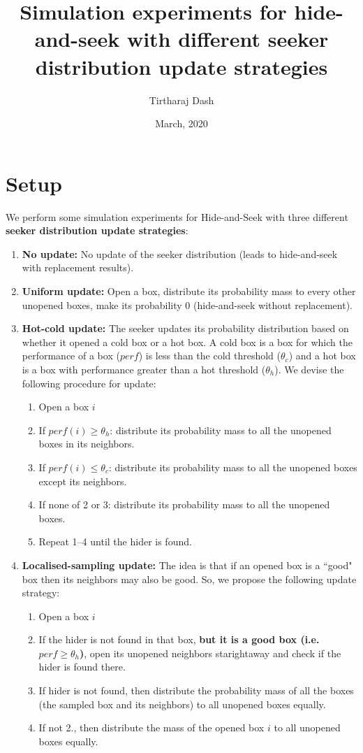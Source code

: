 \documentclass[11pt,a4paper]{article}
\title{Simulation experiments for hide-and-seek with different seeker distribution update strategies}
\author{Tirtharaj Dash}
\date{March, 2020}
\begin{document}
\maketitle

\section{Setup}

\noindent
We perform some simulation experiments for Hide-and-Seek with three different \textbf{seeker distribution update strategies}:
\begin{enumerate}[(1)]
	\item\label{snoupd} \textbf{No update:} No update of the seeker distribution (leads to hide-and-seek with replacement results).
	\item\label{supdwor} \textbf{Uniform update:} Open a box, distribute its probability mass to every other unopened boxes, make its probability 0 (hide-and-seek without replacement).
	\item\label{supdhc} \textbf{Hot-cold update:} The seeker updates its probability distribution based on whether it opened a cold box or a hot box. A cold box is a box for which the performance of a box ($perf$) is less than the cold threshold ($\theta_c$) and a hot box is a box with performance greater than a hot threshold ($\theta_h$). We devise the following procedure for update:
	\begin{enumerate}[1.]
		\item Open a box $i$
		\item If $perf(i) \geq \theta_h$: distribute its probability mass to all the unopened boxes in its neighbors. 
		\item If $perf(i) \leq \theta_c$: distribute its probability mass to all the unopened boxes except its neighbors.
		\item If none of 2 or 3: distribute its probability mass to all the unopened boxes.
		\item Repeat 1--4 until the hider is found.
	\end{enumerate}
	\item\label{supdloc} \textbf{Localised-sampling update:} The idea is that if an opened box is a ``good" box then its neighbors may also be good. So, we propose the following update strategy:
	\begin{enumerate}[1.]
		\item Open a box $i$
		\item If the hider is not found in that box, \textbf{but it is a good box (i.e. $perf \geq \theta_h$)}, open its unopened neighbors starightaway and check if the hider is found there.
		\item If hider is not found, then distribute the probability mass of all the boxes (the sampled box and its neighbors) to all unopened boxes equally.
		\item If not 2., then distribute the mass of the opened box $i$ to all unopened boxes equally. 
	\end{enumerate}
\end{enumerate}
\end{document}

